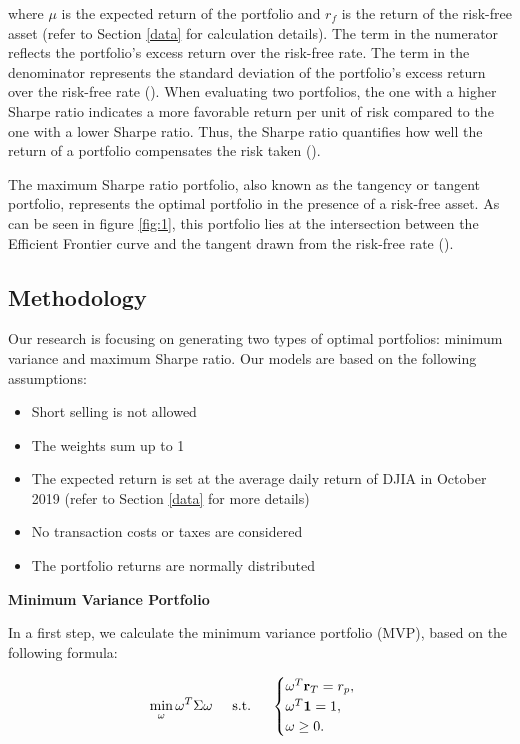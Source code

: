 \documentclass[a4paper,12pt]{article}
\begin{document}
where $\mu$ is the expected return of the portfolio and $r_f$ is the return of the risk-free asset (refer to Section \ref{data} for calculation details). The term in the numerator reflects the portfolio's excess return over the risk-free rate. The term in the denominator represents the standard deviation of the portfolio's excess return over the risk-free rate (\citep{sharpe1994sharpe}). When evaluating two portfolios, the one with a higher Sharpe ratio indicates a more favorable return per unit of risk compared to the one with a lower Sharpe ratio. Thus, the Sharpe ratio quantifies how well the return of a portfolio compensates the risk taken (\citep{gatfaoui2009sharpe}).

The maximum Sharpe ratio portfolio, also known as the tangency or tangent portfolio, represents the optimal portfolio in the presence of a risk-free asset. As can be seen in figure \ref{fig:1}, this portfolio lies at the intersection between the Efficient Frontier curve and the tangent drawn from the risk-free rate (\citep{bodnar2024constructing}).

\subsection{Methodology \label{method}}

Our research is focusing on generating two types of optimal portfolios: minimum variance and maximum Sharpe ratio. Our models are based on the following assumptions:

\begin{itemize}
    \item  Short selling is not allowed 
    \item The weights sum up to 1
    \item The expected return is set at the average daily return of DJIA in October 2019 (refer to Section \ref{data} for more details)
    \item No transaction costs or taxes are considered
    \item The portfolio returns are normally distributed
\end{itemize}


\textbf{Minimum Variance Portfolio}

In a first step, we calculate the minimum variance portfolio (MVP), based on the following formula:

\begin{equation} \label{eq: minvar}
    \min_\omega \omega^T \Sigma \omega \hspace{0.5cm} \text{s.t.} \hspace{0.5cm} 
        \begin{cases} 
            \omega^T \mathbf{r}_T = r_p, \\ 
            \omega^T \mathbf{1} = 1, \\ 
            \omega \geq 0.
        \end{cases} 
\end{equation}
\end{document}
